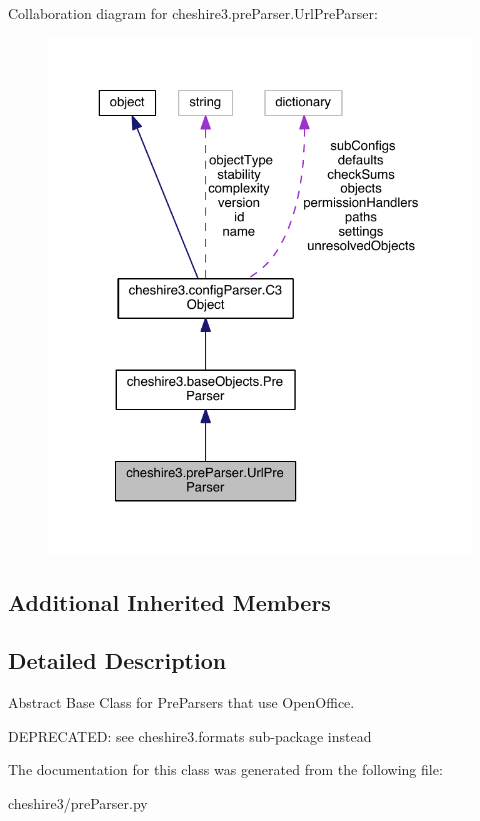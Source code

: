 Collaboration diagram for cheshire3.\-pre\-Parser.\-Url\-Pre\-Parser\-:
\nopagebreak
\begin{figure}[H]
\begin{center}
\leavevmode
\includegraphics[width=325pt]{classcheshire3_1_1pre_parser_1_1_url_pre_parser__coll__graph}
\end{center}
\end{figure}
\subsection*{Additional Inherited Members}


\subsection{Detailed Description}
\begin{DoxyVerb}Abstract Base Class for PreParsers that use OpenOffice.

DEPRECATED: see cheshire3.formats sub-package instead
\end{DoxyVerb}
 

The documentation for this class was generated from the following file\-:\begin{DoxyCompactItemize}
\item 
cheshire3/pre\-Parser.\-py\end{DoxyCompactItemize}
